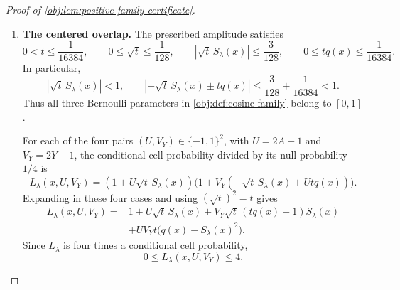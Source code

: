 \documentclass[11pt]{article}
\begin{document}
\begin{proof}[Proof of \cref{obj:lem:positive-family-certificate}]
\begin{enumerate}
For later support counts, define
\[
\mathcal J_x=\{j\in\mathcal J:|x-j\delta_{\mathrm L}|
                                      \le\delta_{\mathrm L}\},
\qquad
\mathcal J_x^\circ=\{j\in\mathcal J:\phi_j(x)\ne0\}.
\]
The closed-support condition places \(j\) between \(j_x-1\) and
\(j_x+1\), while the preceding two-frame argument gives
\[
|\mathcal J_x|\le3,\qquad |\mathcal J_x^\circ|\le2,
\qquad
|F_\lambda(x)|\le\sum_{j\in\mathcal J_x}|\phi_j(x)|\le3,
\qquad |S_\lambda(x)|\le3.
\]

Uniform binary signs are independent, and pairing encodings that differ
in one coordinate gives
\[
E_\lambda\sigma_{\lambda,j}=0,
\qquad
E_\lambda(\sigma_{\lambda,j}\sigma_{\lambda,j'})
=
\begin{cases}
1,&j=j',\\
0,&j\ne j'.
\end{cases}
\]
Expanding the finite frame sum and its square therefore yields
\[
E_\lambda S_\lambda(x)=0,
\qquad
E_\lambda S_\lambda(x)^2
=q(x)\sum_{j\in\mathcal J}\phi_j(x)^2=q(x).
\]

\item \textbf{The centered overlap.}
The prescribed amplitude satisfies
\[
0<t\le\frac1{16384},
\qquad
0\le\sqrt t\le\frac1{128},
\qquad
|\sqrt t\,S_\lambda(x)|\le\frac3{128},
\qquad
0\le tq(x)\le\frac1{16384}.
\]
In particular,
\[
\left|\sqrt t\,S_\lambda(x)\right|<1,
\qquad
\left|-\sqrt t\,S_\lambda(x)\pm tq(x)\right|
\le\frac3{128}+\frac1{16384}<1.
\]
Thus all three Bernoulli parameters in
\cref{obj:def:cosine-family} belong to \([0,1]\).

For each of the four pairs
\((U,V_Y)\in\{-1,1\}^2\), with \(U=2A-1\) and \(V_Y=2Y-1\),
the conditional cell probability divided by its null probability
\(1/4\) is
\[
L_\lambda(x,U,V_Y)
=(1+U\sqrt t\,S_\lambda(x))
 \bigl(1+V_Y(-\sqrt t\,S_\lambda(x)+Utq(x))\bigr).
\]
Expanding in these four cases and using \((\sqrt t)^2=t\) gives
\[
\begin{aligned}
L_\lambda(x,U,V_Y)
={}&1+U\sqrt t\,S_\lambda(x)
 +V_Y\sqrt t\,(tq(x)-1)S_\lambda(x)\\
&+UV_Yt\bigl(q(x)-S_\lambda(x)^2\bigr).
\end{aligned}
\]
Since \(L_\lambda\) is four times a conditional cell probability,
\[
0\le L_\lambda(x,U,V_Y)\le4.
\]


\end{enumerate}
\end{proof}
\end{document}
